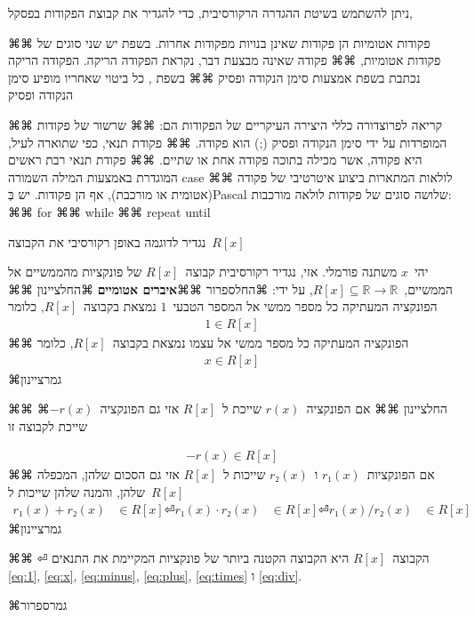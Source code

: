 ניתן להשתמש בשיטת ההגדרה הרקורסיבית, כדי להגדיר את קבוצת הפקודות בפסקל,
\begin{enumerate}
⌘⌘   פקודות אטומיות הן פקודות שאינן בנויות מפקודות אחרות. בשפת  יש שני סוגים של פקודות אטומיות, 
     ⌘⌘   פקודה שאינה מבצעת דבר, נקראת הפקודה הריקה. הפקודה הריקה  נכתבת בשפת  אמצעות סימן הנקודה ופסיק \cc{;}
      ⌘⌘  בשפת , כל ביטוי שאחריו מופיע  סימן הנקודה ופסיק \cc{;}
      \begin{CPLUSPLUS}
      
         \end{CPLUSPLUS}
      ⌘⌘ קריאה לפרוצדורה
      כללי היצירה העיקריים של הפקודות הם:
      ⌘⌘ שרשור של פקודות המופרדות על ידי סימן הנקודה ופסיק (;) הוא פקודה.
      ⌘⌘ פקודת תנאי, כפי שתוארה לעיל, היא פקודה, אשר מכילה בתוכה פקודה אחת או שתיים.
      ⌘⌘ פקודת תנאי רבת ראשים המוגדרת באמצעות המילה השמורה case
      ⌘⌘ לולאות המתארות ביצוע איטרטיבי של פקודה (אטומית או מורכבת), אף הן פקודות. יש בְּPascal שלושה סוגים של פקודות לולאה מורכבות:
      ⌘⌘ for
      ⌘⌘ while
      ⌘⌘ repeat until
\end{enumerate}
      

נגדיר לדוגמה באופן רקורסיבי את הקבוצה~$R[x]$
\begin{Definition}
יהי~$x$ משתנה פורמלי. אזי, נגדיר רקורסיבית קבוצה~$R[x]$ של פונקציות מהממשיים אל הממשיים,~$R[x]⊆ℝ→ℝ$,
על ידי:
⌘החל{ספרור}
⌘⌘\textbf{איברים אטומיים}
⌘החל{ציינון}
⌘⌘ הפונקציה המעתיקה כל מספר ממשי אל המספר הטבעי~$1$ נמצאת בקבוצה~$R[x]$, כלומר
\begin{align}
\label{eq:1}
1∈R[x]
\end{align}
⌘⌘ הפונקציה המעתיקה כל מספר ממשי אל עצמו נמצאת בקבוצה~$R[x]$, כלומר
\begin{align}
\label{eq:x}
x∈R[x]
\end{align}
⌘גמר{ציינון}

⌘⌘
⌘החל{ציינון}
⌘⌘ אם הפונקציה~$r(x)$ שייכת ל~$R[x]$ אזי גם הפונקציה~$-r(x)$ שייכת לקבוצה זו

\begin{align}
\label{eq:minus}
-r(x)∈R[x]
\end{align}
⌘⌘ אם הפונקציות~$r₁(x)$ ו~$r₂(x)$ שייכות ל~$R[x]$ אזי גם הסכום שלהן, המכפלה שלהן, והמנה שלהן שייכות ל~$R[x]$
\begin{align}
  r₁(x)+r₂(x)&∈R[x] \label{eq:plus} ⏎
  r₁(x)·r₂(x)&∈R[x] \label{eq:times} ⏎
  r₁(x)/r₂(x)&∈R[x] \label{eq:div}
\end{align}
⌘גמר{ציינון}

⌘⌘ ⏎
הקבוצה~$R[x]$ היא הקבוצה הקטנה ביותר של פונקציות המקיימת את התנאים
\cref{eq:1},
\cref{eq:x},
\cref{eq:minus},
\cref{eq:plus},
\cref{eq:times}
ו
\cref{eq:div}.

⌘גמר{ספרור}
\end{Definition}

